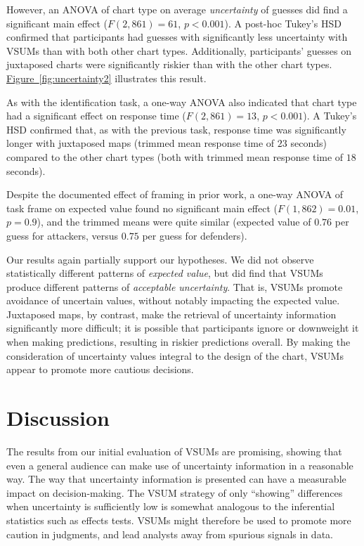 \documentclass{vgtc}                          %
\newcommand{\figref}[1]{\hyperref[#1]{Figure~\ref*{#1}}}
\begin{document}
However, an ANOVA of chart type on average \emph{uncertainty} of guesses did find a significant main effect ($F(2,861)=61$, $p<0.001$). A post-hoc Tukey's HSD confirmed that participants had guesses with significantly less uncertainty with VSUMs than with both other chart types. Additionally, participants' guesses on juxtaposed charts were significantly riskier than with the other chart types. \figref{fig:uncertainty2} illustrates this result.

As with the identification task, a one-way ANOVA also indicated that chart type had a significant effect on response time ($F(2,861)=13$, $p<0.001$). A Tukey's HSD confirmed that, as with the previous task, response time was significantly longer with juxtaposed maps (trimmed mean response time of $23$ seconds) compared to the other chart types (both with trimmed mean response time of $18$ seconds).

Despite the documented effect of framing in prior work, a one-way ANOVA of task frame on expected value found no significant main effect ($F(1,862)=0.01$, $p=0.9$), and the trimmed means were quite similar (expected value of $0.76$ per guess for attackers, versus $0.75$ per guess for defenders).

Our results again partially support our hypotheses. We did not observe statistically different patterns of \emph{expected value}, but did find that VSUMs produce different patterns of \emph{acceptable uncertainty}. That is, VSUMs promote avoidance of uncertain values, without notably impacting the expected value. Juxtaposed maps, by contrast, make the retrieval of uncertainty information significantly more difficult; it is possible that participants ignore or downweight it when making predictions, resulting in riskier predictions overall. By making the consideration of uncertainty values integral to the design of the chart, VSUMs appear to promote more cautious decisions.

\section{Discussion}

\sizeFig

The results from our initial evaluation of VSUMs are promising, showing that even a general audience can make use of uncertainty information in a reasonable way. The way that uncertainty information is presented can have a measurable impact on decision-making. The VSUM strategy of only ``showing'' differences when uncertainty is sufficiently low is somewhat analogous to the inferential statistics such as effects tests. VSUMs might therefore be used to promote more caution in judgments, and lead analysts away from spurious signals in data.
\end{document}
